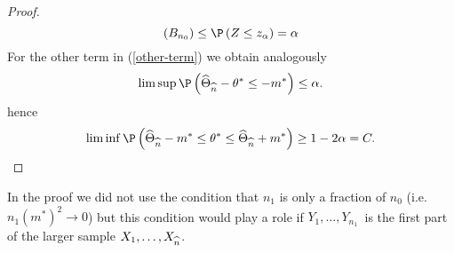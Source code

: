 \begin{proof}
\begin{equation*}
\left( B_{n_{0}}\right) \leq \P \left( Z\leq z_{\alpha}\right)
=\alpha
\end{equation*}%
For the other term in (\ref{other-term}) we obtain analogously 
\begin{equation*}
\limsup \P \left( \widehat{\Theta}_{\widehat{n}}-\theta^*\leq -m^{\ast }\right) \leq \alpha .
\end{equation*}%
hence 
\begin{equation*}
\liminf \P \left( \widehat{\Theta}_{\widehat{n}}-m^{\ast }\leq \theta^*\leq \widehat{\Theta}_{\widehat{n}%
}+m^{\ast }\right) \geq 1-2\alpha =C.
\end{equation*}
\end{proof}


\begin{rem}
In the proof we did not use the condition that $n_{1}$ is
only a fraction of $n_{0}$ (i.e. $n_{1}\left( m^{\ast }\right)
^{2}\rightarrow 0$) but this condition would play a role if $Y_{1},\ldots
,Y_{n_{1}}$\emph{\ }is the first part of the larger sample $X_{1},\ldots ,X_{%
\widehat{n}}$.
\end{rem}

\remove{
}
